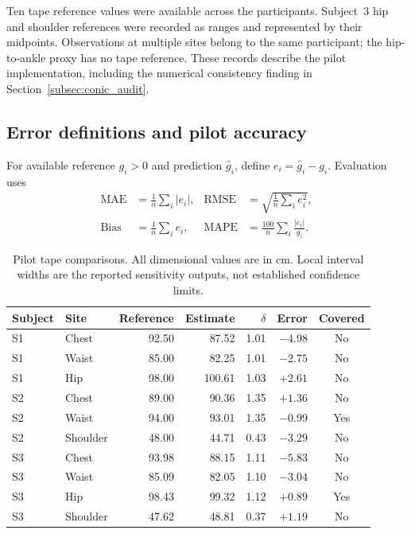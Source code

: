 \documentclass[11pt,a4paper]{article}
\numberwithin{equation}{section}
\begin{document}
Ten tape reference values were available across the participants. Subject~3 hip and shoulder references were recorded as ranges and represented by their midpoints. Observations at multiple sites belong to the same participant; the hip-to-ankle proxy has no tape reference. These records describe the pilot implementation, including the numerical consistency finding in Section~\ref{subsec:conic_audit}.

\subsection{Error definitions and pilot accuracy}
For available reference $g_i>0$ and prediction $\hat g_i$, define $e_i=\hat g_i-g_i$. Evaluation uses
\begin{align}
\operatorname{MAE}&=\frac1n\sum_i|e_i|,&
\operatorname{RMSE}&=\sqrt{\frac1n\sum_i e_i^2},\nonumber\\
\operatorname{Bias}&=\frac1n\sum_i e_i,&
\operatorname{MAPE}&=\frac{100}{n}\sum_i\frac{|e_i|}{g_i}.
\label{eq:error_metrics}
\end{align}
\begin{table}[htbp]
\centering\small
\caption{Pilot tape comparisons. All dimensional values are in cm. Local interval widths are the reported sensitivity outputs, not established confidence limits.}
\label{tab:pilot_measurements}
\begin{tabular}{llrrrrc}
\toprule
Subject & Site & Reference & Estimate & $\delta$ & Error & Covered \\
\midrule
S1 & Chest & 92.50 & 87.52 & 1.01 & $-4.98$ & No \\
S1 & Waist & 85.00 & 82.25 & 1.01 & $-2.75$ & No \\
S1 & Hip & 98.00 & 100.61 & 1.03 & $+2.61$ & No \\
S2 & Chest & 89.00 & 90.36 & 1.35 & $+1.36$ & No \\
S2 & Waist & 94.00 & 93.01 & 1.35 & $-0.99$ & Yes \\
S2 & Shoulder & 48.00 & 44.71 & 0.43 & $-3.29$ & No \\
S3 & Chest & 93.98 & 88.15 & 1.11 & $-5.83$ & No \\
S3 & Waist & 85.09 & 82.05 & 1.10 & $-3.04$ & No \\
S3 & Hip & 98.43 & 99.32 & 1.12 & $+0.89$ & Yes \\
S3 & Shoulder & 47.62 & 48.81 & 0.37 & $+1.19$ & No \\
\bottomrule
\end{tabular}
\end{table}
\end{document}
